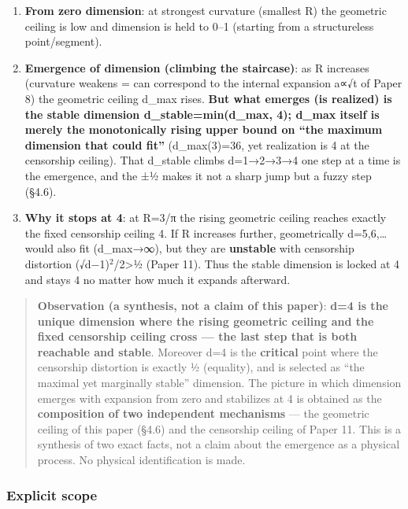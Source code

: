 \documentclass[
]{ltjsarticle}
\begin{document}
\begin{enumerate}
\def\labelenumi{(\roman{enumi})}
\item
  \textbf{From zero dimension}: at strongest curvature (smallest R) the
  geometric ceiling is low and dimension is held to 0--1 (starting from
  a structureless point/segment).
\item
  \textbf{Emergence of dimension (climbing the staircase)}: as R
  increases (curvature weakens = can correspond to the internal
  expansion a∝√t of Paper 8) the geometric ceiling d\_max rises.
  \textbf{But what emerges (is realized) is the stable dimension
  d\_stable=min(d\_max, 4); d\_max itself is merely the monotonically
  rising upper bound on ``the maximum dimension that could fit''}
  (d\_max(3)=36, yet realization is 4 at the censorship ceiling). That
  d\_stable climbs d=1→2→3→4 one step at a time is the emergence, and
  the ±½ makes it not a sharp jump but a fuzzy step (§4.6).
\item
  \textbf{Why it stops at 4}: at R=3/π the rising geometric ceiling
  reaches exactly the fixed censorship ceiling 4. If R increases
  further, geometrically d=5,6,\ldots{} would also fit (d\_max→∞), but
  they are \textbf{unstable} with censorship distortion
  (√d−1)\(^{2}\)/2\textgreater½ (Paper 11). Thus the stable dimension is
  locked at 4 and stays 4 no matter how much it expands afterward.
\end{enumerate}

\begin{quote}
\textbf{Observation (a synthesis, not a claim of this paper)}:
\textbf{d=4 is the unique dimension where the rising geometric ceiling
and the fixed censorship ceiling cross --- the last step that is both
reachable and stable}. Moreover d=4 is the \textbf{critical} point where
the censorship distortion is exactly ½ (equality), and is selected as
``the maximal yet marginally stable'' dimension. The picture in which
dimension emerges with expansion from zero and stabilizes at 4 is
obtained as the \textbf{composition of two independent mechanisms} ---
the geometric ceiling of this paper (§4.6) and the censorship ceiling of
Paper 11. This is a synthesis of two exact facts, not a claim about the
emergence as a physical process. No physical identification is made.
\end{quote}

\subsubsection{Explicit scope}\label{explicit-scope}
\end{document}
